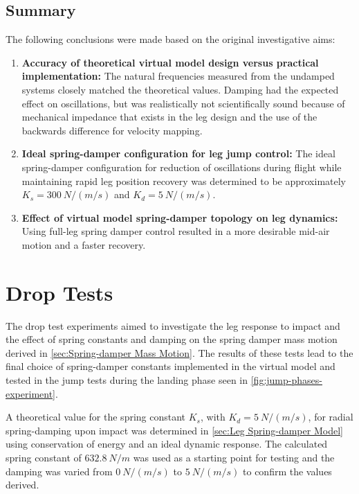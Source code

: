 \subsection{Summary}

The following conclusions were made based on the original investigative aims:

\begin{enumerate}
\item \textbf{Accuracy of theoretical virtual model design versus practical implementation:} The natural frequencies measured from the undamped systems closely matched the theoretical values. Damping had the expected effect on oscillations, but was realistically not scientifically sound because of mechanical impedance that exists in the leg design and the use of the backwards difference for velocity mapping.
\item \textbf{Ideal spring-damper configuration for leg jump control:} The ideal spring-damper configuration for reduction of oscillations during flight while maintaining rapid leg position recovery was determined to be approximately $K_s = 300\ N/(m/s)$ and $K_d = 5\ N/(m/s)$.
\item \textbf{Effect of virtual model spring-damper topology on leg dynamics:} Using full-leg spring damper control resulted in a more desirable mid-air motion and a faster recovery.
\end{enumerate}

\section{Drop Tests}
\label{sec:Drop Tests}

The drop test experiments aimed to investigate the leg response to impact and the effect of spring constants and damping on the spring damper mass motion derived in \cref{sec:Spring-damper Mass Motion}. The results of these tests lead to the final choice of spring-damper constants implemented in the virtual model and tested in the jump tests during the landing phase seen in \cref{fig:jump-phases-experiment}.

A theoretical value for the spring constant $K_s$, with $K_d = 5\ N/(m/s)$, for radial spring-damping upon impact was determined in \cref{sec:Leg Spring-damper Model} using conservation of energy and an ideal dynamic response. The calculated spring constant of $632.8\ N/m$ was used as a starting point for testing and the damping was varied from $0\ N/(m/s)$ to $5\ N/(m/s)$ to confirm the values derived.

